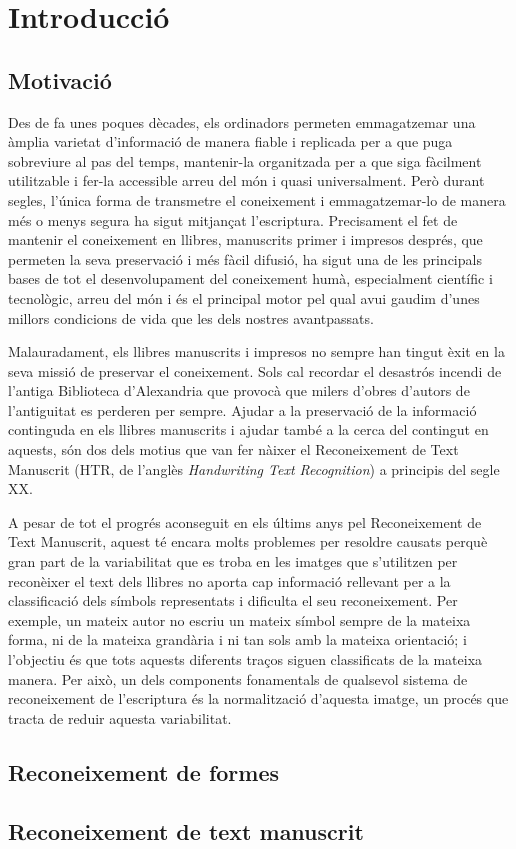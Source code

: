 \chapter{Introducció}
\label{cap:int}

\section{Motivació}
Des de fa unes poques dècades, els ordinadors permeten emmagatzemar una àmplia varietat d'informació de manera fiable i replicada per a que puga sobreviure al pas del temps, mantenir-la organitzada per a que siga fàcilment utilitzable i fer-la accessible arreu del món i quasi universalment. Però durant segles, l'única forma de transmetre el coneixement i emmagatzemar-lo de manera més o menys segura ha sigut mitjançat l'escriptura. Precisament el fet de mantenir el coneixement en llibres, manuscrits primer i impresos després, que permeten la seva preservació i més fàcil difusió, ha sigut una de les principals bases de tot el desenvolupament del coneixement humà, especialment científic i tecnològic, arreu del món i és el principal motor pel qual avui gaudim d'unes millors condicions de vida que les dels nostres avantpassats.

Malauradament, els llibres manuscrits i impresos no sempre han tingut èxit en la seva missió de preservar el coneixement. Sols cal recordar el desastrós incendi de l'antiga Biblioteca d'Alexandria que provocà que milers d'obres d'autors de l'antiguitat es perderen per sempre. Ajudar a la preservació de la informació continguda en els llibres manuscrits i ajudar també a la cerca del contingut en aquests, són dos dels motius que van fer nàixer el Reconeixement de Text Manuscrit (HTR, de l'anglès \emph{Handwriting Text Recognition}) a principis del segle XX.

A pesar de tot el progrés aconseguit en els últims anys pel Reconeixement de Text Manuscrit, aquest té encara molts problemes per resoldre causats perquè gran part de la variabilitat que es troba en les imatges que s'utilitzen per reconèixer el text dels llibres no aporta cap informació rellevant per a la classificació dels símbols representats i dificulta el seu reconeixement. Per exemple, un mateix autor no escriu un mateix símbol sempre de la mateixa forma, ni de la mateixa grandària i ni tan sols amb la mateixa orientació; i l'objectiu és que tots aquests diferents traços siguen classificats de la mateixa manera. Per això, un dels components fonamentals de qualsevol sistema de reconeixement de l'escriptura és la normalització d'aquesta imatge, un procés que tracta de reduir aquesta variabilitat.


\section{Reconeixement de formes}

\section{Reconeixement de text manuscrit}